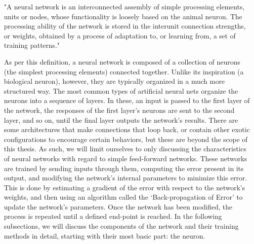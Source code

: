 \documentclass[11pt,a4paper,oldfontcommands]{memoir}
\begin{document}
"A neural network is an interconnected assembly of simple processing elements, units or nodes, whose functionality is loosely based on the animal neuron. The processing ability of the network is stored in the interunit connection strengths, or weights, obtained by a process of adaptation to, or learning from, a set of training patterns." \cite{nn_book}

As per this definition, a neural network is composed of a collection of neurons (the simplest processing elements) connected together. Unlike its inspiration (a biological neuron), however, they are typically organized in a much more structured way. The most common types of artificial neural nets organize the neurons into a sequence of layers. In these, an input is passed to the first layer of the network, the responses of the first layer's neurons are sent to the second layer, and so on, until the final layer outputs the network's results. There are some architectures that make connections that loop back, or contain other exotic configurations to encourage certain behaviors, but these are beyond the scope of this thesis. As such, we will limit ourselves to only discussing the characteristics of neural networks with regard to simple feed-forward networks. These networks are trained by sending inputs through them, computing the error present in its output, and modifying the network's internal parameters to minimize this error. This is done by estimating a gradient of the error with respect to the network's weights, and then using an algorithm called the `Back-propagation of Error' to update the network's parameters. Once the network has been modified, the process is repeated until a defined end-point is reached. In the following subsections, we will discuss the components of the network and their training methods in detail, starting with their most basic part: the neuron.
\end{document}
